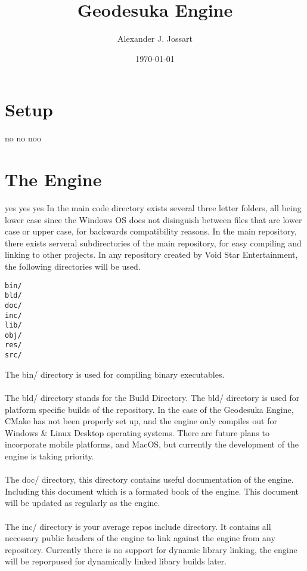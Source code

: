 \documentclass[a4paper,10pt]{book}
\title{Geodesuka Engine}
\author{Alexander J. Jossart}
\date{\today}
\begin{document}
\maketitle


\chapter{Setup}
no no noo
\chapter{The Engine}
yes yes yes
In the main code directory exists several three letter folders, all being lower case since the Windows OS does not disinguish between files
that are lower case or upper case, for backwards compatibility reasons. In the main repository, there exists serveral subdirectories of the main
repository, for easy compiling and linking to other projects. In any repository created by Void Star Entertainment, the following directories will
be used.
\begin{lstlisting}
bin/
bld/
doc/
inc/
lib/
obj/
res/
src/
\end{lstlisting}
The bin/ directory is used for compiling binary executables. \\ \\
The bld/ directory stands for the Build Directory. The bld/ directory is used for platform specific builds of the repository.
In the case of the Geodesuka Engine, CMake has not been properly set up, and the engine only compiles out for Windows \& Linux Desktop operating systems. There are future plans
to incorporate mobile platforms, and MacOS, but currently the development of the engine is taking priority. \\ \\ The doc/ directory, this directory contains useful documentation
of the engine. Including this document which is a formated book of the engine. This document will be updated as regularly as the engine. \\ \\ The inc/ directory is your average repos include directory.
It contains all necessary public headers of the engine to link against the engine from any repository. Currently there is no support for dynamic library linking, the engine will be reporpused for dynamically
linked libary builds later.
\end{document}
